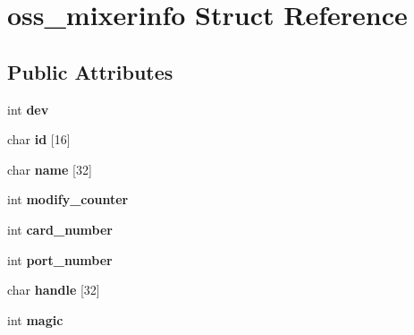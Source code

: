 \hypertarget{structoss__mixerinfo}{}\section{oss\+\_\+mixerinfo Struct Reference}
\label{structoss__mixerinfo}
\subsection*{Public Attributes}
\begin{DoxyCompactItemize}
\item 
int {\bfseries dev}\hypertarget{structoss__mixerinfo_a13b3ebd479d6628656331195d6187aef}{}\label{structoss__mixerinfo_a13b3ebd479d6628656331195d6187aef}

\item 
char {\bfseries id} \mbox{[}16\mbox{]}\hypertarget{structoss__mixerinfo_a9f583d7613c46e7551b5946a9ae2f8b7}{}\label{structoss__mixerinfo_a9f583d7613c46e7551b5946a9ae2f8b7}

\item 
char {\bfseries name} \mbox{[}32\mbox{]}\hypertarget{structoss__mixerinfo_a8b6de533c7138e95a990b7ff85bb585b}{}\label{structoss__mixerinfo_a8b6de533c7138e95a990b7ff85bb585b}

\item 
int {\bfseries modify\+\_\+counter}\hypertarget{structoss__mixerinfo_a53fc06c041ab387a775ff89697a76687}{}\label{structoss__mixerinfo_a53fc06c041ab387a775ff89697a76687}

\item 
int {\bfseries card\+\_\+number}\hypertarget{structoss__mixerinfo_a83abb26346bdc791aa07eed28ad39eda}{}\label{structoss__mixerinfo_a83abb26346bdc791aa07eed28ad39eda}

\item 
int {\bfseries port\+\_\+number}\hypertarget{structoss__mixerinfo_a7095e88506abd313b1990b63e705dd46}{}\label{structoss__mixerinfo_a7095e88506abd313b1990b63e705dd46}

\item 
char {\bfseries handle} \mbox{[}32\mbox{]}\hypertarget{structoss__mixerinfo_a76e15fa4930da3d32006d927f5e0817b}{}\label{structoss__mixerinfo_a76e15fa4930da3d32006d927f5e0817b}

\item 
int {\bfseries magic}\hypertarget{structoss__mixerinfo_a480e31e16b649162d3b07cfbeae9f5dc}{}\label{structoss__mixerinfo_a480e31e16b649162d3b07cfbeae9f5dc}


\end{DoxyCompactItemize}
